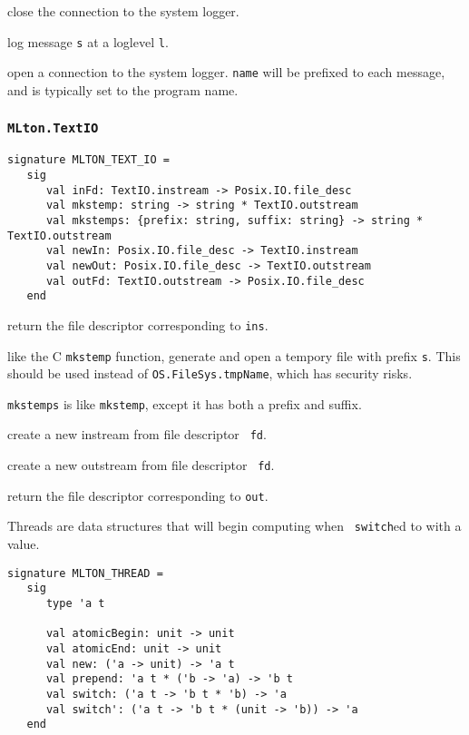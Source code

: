 \begin{description}
close the connection to the system logger.

log message {\tt s} at a loglevel {\tt l}.

open a connection to the system logger. {\tt name} will be prefixed to each
message, and is typically set to the program name.

\end{description}

\subsubsection{{\tt MLton.TextIO}}
\begin{verbatim}
signature MLTON_TEXT_IO =
   sig
      val inFd: TextIO.instream -> Posix.IO.file_desc
      val mkstemp: string -> string * TextIO.outstream
      val mkstemps: {prefix: string, suffix: string} -> string * TextIO.outstream
      val newIn: Posix.IO.file_desc -> TextIO.instream
      val newOut: Posix.IO.file_desc -> TextIO.outstream
      val outFd: TextIO.outstream -> Posix.IO.file_desc
   end
\end{verbatim}

\begin{description}

 return the file descriptor corresponding to
{\tt ins}.

like the C {\tt mkstemp} function, generate and open a tempory file with prefix
{\tt s}.  This should be used instead of {\tt OS.FileSys.tmpName}, which has
security risks.

{\tt mkstemps} is like {\tt mkstemp}, except it has both a prefix and suffix.

 create a new instream from file descriptor {\tt 
fd}.

 create a new outstream from file descriptor {\tt 
fd}.

 return the file descriptor corresponding to
{\tt out}.
\end{description}

Threads are data structures that will begin computing when {\tt
switch}ed to with a value.
\begin{verbatim}
signature MLTON_THREAD =
   sig
      type 'a t

      val atomicBegin: unit -> unit
      val atomicEnd: unit -> unit
      val new: ('a -> unit) -> 'a t
      val prepend: 'a t * ('b -> 'a) -> 'b t
      val switch: ('a t -> 'b t * 'b) -> 'a
      val switch': ('a t -> 'b t * (unit -> 'b)) -> 'a
   end
\end{verbatim}

